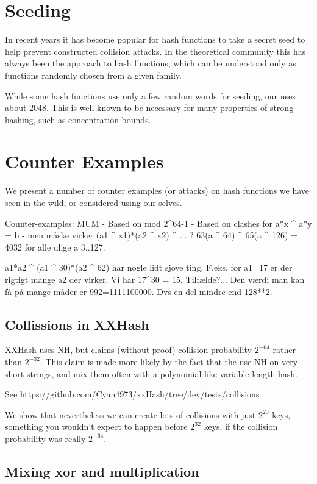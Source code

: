 \section{Seeding}

In recent years it has become popular for hash functions to take a secret seed
to help prevent constructed collision attacks.
In the theoretical community this has always been the approach to hash functions,
which can be understood only as functions randomly chosen from a given family.

While some hash functions use only a few random words for seeding, our uses about 2048.
This is well known to be necessary for many properties of strong hashing, such as concentration bounds.

   

\section{Counter Examples}

We present a number of counter examples (or attacks) on hash functions we have seen in the wild, or considered using our selves.

Counter-examples:
MUM
   - Based on mod 2^64-1
   - Based on clashes for a*x ^ a*y = b
   - men måske virker (a1 ^ x1)*(a2 ^ x2) ^ ... ?
   63(a ^ 64) ^ 65(a ^ 126) = 4032
   for alle ulige a 3..127.


   a1*a2 ^ (a1 ^ 30)*(a2 ^ 62)
   har nogle lidt sjove ting. F.eks. for a1=17 er der rigtigt mange a2 der virker.
   Vi har 17^30 = 15. Tilfælde?...
   Den værdi man kan få på mange måder er 992=1111100000. Dvs en del mindre end 128**2.

\subsection{Collissions in XXHash}
XXHash uses NH, but claims (without proof) collision probability $2^{-64}$ rather than $2^{-32}$.
This claim is made more likely by the fact that the use NH on very short strings, and mix them often with a polynomial like variable length hash.

See https://github.com/Cyan4973/xxHash/tree/dev/tests/collisions

We show that nevertheless we can create lots of collisions with just $2^{20}$ keys, something you wouldn't expect to happen before $2^{32}$ keys, if the collision probability was really $2^{-64}$.

\subsection{Mixing xor and multiplication}

